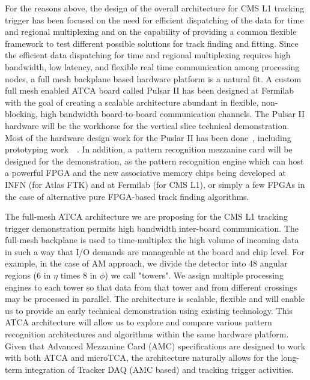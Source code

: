 	For the reasons above, the design of the overall architecture for CMS L1 tracking trigger has been focused on the need for efficient dispatching of the data for time and regional multiplexing and on the capability of providing a common flexible framework to test different possible solutions for track finding and fitting. Since the efficient data dispatching for time and regional multiplexing requires high bandwidth, low latency, and flexible real time communication among processing nodes, a full mesh backplane based hardware platform is a natural fit. A custom full mesh enabled ATCA board called Pulsar II has been designed at Fermilab with the goal of creating a scalable architecture abundant in flexible, non-blocking, high bandwidth board-to-board communication channels. The Pulsar II hardware will be the workhorse for the vertical slice technical demonstration. Most of the hardware design work for the Puslar II has been done~\cite{bib:PulsarII}, including prototyping work~\cite{bib:PulsarII-results}~\cite{bib:PulsarII-weblink}. In addition, a pattern recognition mezzanine card will be designed for the demonstration,  as the pattern recognition engine which can host a powerful FPGA and the new associative memory chips being developed at INFN (for Atlas FTK) and at Fermilab (for CMS L1), or simply a few FPGAs in the case of alternative pure FPGA-based track finding algorithms.  

	The full-mesh ATCA architecture we are proposing for the CMS L1 tracking trigger demonstration permits high bandwidth inter-board communication. The full-mesh backplane is used to time-multiplex the high volume of incoming data in such a way that I/O demands are manageable at the board and chip level. For example, in the case of AM approach, we divide the detector into 48 angular regions (6 in $\eta$ times 8 in $\phi$) we call "towers". We assign multiple processing engines to each tower so that data from that  tower and from different crossings may be processed in parallel. The architecture is scalable, flexible and will enable us to provide an early technical demonstration using existing technology. This ATCA architecture will allow us to explore and compare various pattern recognition architectures and algorithms within the same hardware platform. Given that Advanced Mezzanine Card (AMC) specifications are designed to work with both ATCA and microTCA, the architecture naturally allows for the long-term integration of Tracker DAQ (AMC based) and tracking trigger activities. 

